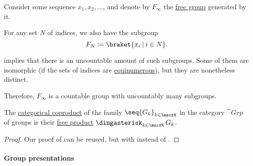\begin{example}\label{ex:free_group_with_uncountably_many_subgroups}
  Consider some sequence \( x_1, x_2, \ldots \), and denote by \( F_\infty \) the \hyperref[def:free_group]{free group} generated by it.

  For any set \( N \) of indices, we also have the subgroup
  \begin{equation*}
    F_N \coloneqq \braket{ x_i \given i \in N }.
  \end{equation*}

   implies that there is an uncountable amount of such subgroups. Some of them are isomorphic (if the sets of indices are \hyperref[def:equinumerosity]{equinumerous}), but they are nonetheless distinct.

  Therefore, \( F_\infty \) is a countable group with uncountably many subgroups.
\end{example}

\begin{proposition}\label{thm:group_coproduct}
  The \hyperref[def:discrete_category_limits]{categorical coproduct} of the family \( \seq{ G_k }_{k \in \mscrK} \) in the category \hyperref[def:group/category]{\( \cat{Grp} \)} of groups is their \hyperref[def:monoid_free_product]{free product} \( \Ast_{k \in \mscrK} G_k \).
\end{proposition}
\begin{proof}
  Our proof of  can be reused, but with  instead of .
\end{proof}

\paragraph{Group presentations}

